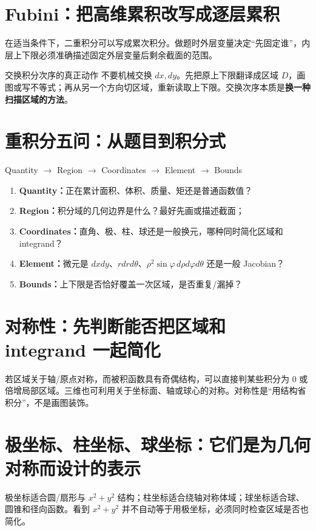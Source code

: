 \documentclass[11pt,a4paper,openany]{ctexbook}
\newcommand{\key}[1]{\textbf{\color{deep}#1}}
\begin{document}
\section{Fubini：把高维累积改写成逐层累积}
在适当条件下，二重积分可以写成累次积分。做题时外层变量决定“先固定谁”，内层上下限必须准确描述固定外层变量后剩余截面的范围。

\begin{examBox}{交换积分次序的真正动作}
不要机械交换 $dx,dy$。先把原上下限翻译成区域 $D$，画图或写不等式；再从另一个方向切区域，重新读取上下限。交换次序本质是\key{换一种扫描区域的方法}。
\end{examBox}

\section{重积分五问：从题目到积分式}
\begin{corebox}{Quantity $\to$ Region $\to$ Coordinates $\to$ Element $\to$ Bounds}
\begin{enumerate}
  \item \key{Quantity：}正在累计面积、体积、质量、矩还是普通函数值？
  \item \key{Region：}积分域的几何边界是什么？最好先画或描述截面；
  \item \key{Coordinates：}直角、极、柱、球还是一般换元，哪种同时简化区域和 integrand？
  \item \key{Element：}微元是 $dxdy$、$rdrd\theta$、$\rho^2\sin\varphi\,d\rho d\varphi d\theta$ 还是一般 Jacobian？
  \item \key{Bounds：}上下限是否恰好覆盖一次区域，是否重复/漏掉？
\end{enumerate}
\end{corebox}

\section{对称性：先判断能否把区域和 integrand 一起简化}
若区域关于轴/原点对称，而被积函数具有奇偶结构，可以直接判某些积分为 0 或倍增局部区域。三维也可利用关于坐标面、轴或球心的对称。对称性是“用结构省积分”，不是画图装饰。

\section{极坐标、柱坐标、球坐标：它们是为几何对称而设计的表示}
极坐标适合圆/扇形与 $x^2+y^2$ 结构；柱坐标适合绕轴对称体域；球坐标适合球、圆锥和径向函数。看到 $x^2+y^2$ 并不自动等于用极坐标，必须同时检查区域是否也简化。
\end{document}
